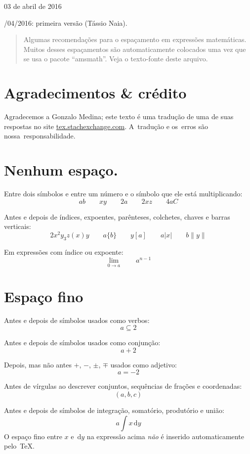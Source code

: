\documentclass[11pt,article]{memoir}
\begin{document}
\hfill 03 de abril de 2016

\medskip

/04/2016: primeira versão (Tássio Naia).

\bigskip

\begin{abstract}
  Algumas recomendações para o espaçamento em expressões matemáticas.
  Muitos desses espaçamentos são automaticamente colocados uma vez que
  se usa o pacote ``amsmath''. Veja o texto-fonte deste arquivo.
\end{abstract}


\chapter*{Agradecimentos \& crédito}

Agradecemos a Gonzalo Medina; este texto é uma tradução de
uma de suas respostas no site \url{tex.stachexchange.com}.
A~tradução e os~erros são nossa~responsabilidade.

\chapter{Nenhum espaço.}
Entre dois símbolos e entre um número e o símbolo que ele está multiplicando:
\[
  ab\qquad xy\qquad 2a\qquad 2xz\qquad 4aC
\]

Antes e depois de índices, expoentes, parênteses, colchetes, chaves e barras
verticais:
\[
  2x^2y_3z (x)y\qquad a\{b\}\qquad y[a]\qquad a\lvert x\rvert\qquad b\lVert y\rVert
\]

Em expressões com índice ou expoente:
\[
  \lim_{0\to a}\qquad a^{n-1}
\]

\chapter{Espaço fino}
Antes e depois de símbolos usados como verbos:
\[
  a \subseteq 2
\]

Antes e depois de símbolos usados como conjunção:
\[
  a +2
\]

Depois, mas não antes $+$, $-$, $\pm$, $\mp$ usados como adjetivo:
\[
  a= -2
\]

Antes de vírgulas ao descrever conjuntos, sequências de frações e
coordenadas:
\[ (a,b,c) \]

Antes e depois de símbolos de integração, somatório, produtório e
união:
\[
  a\int x\,\mathrm{d}y
\]
O espaço fino entre $x$ e~$\mathrm{d}y$ na expressão acima \emph{não} é inserido
automaticamente pelo~\TeX.
\end{document}
